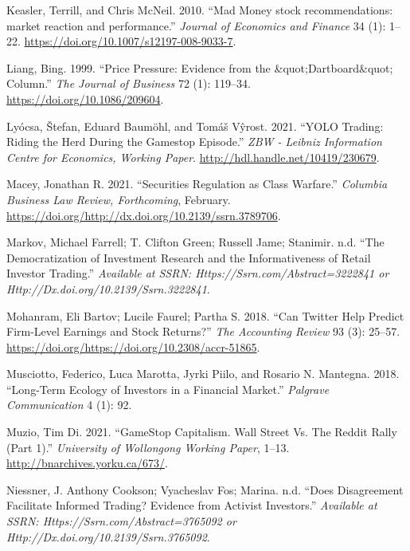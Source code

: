 \documentclass[12pt,]{article}
\begin{document}
\leavevmode\hypertarget{ref-keasler2010}{}%
Keasler, Terrill, and Chris McNeil. 2010. ``Mad Money stock
recommendations: market reaction and performance.'' \emph{Journal of
Economics and Finance} 34 (1): 1--22.
\url{https://doi.org/10.1007/s12197-008-9033-7}.

\leavevmode\hypertarget{ref-liang1999}{}%
Liang, Bing. 1999. ``Price Pressure: Evidence from the
\&quot;Dartboard\&quot; Column.'' \emph{The Journal of Business} 72 (1):
119--34. \url{https://doi.org/10.1086/209604}.

\leavevmode\hypertarget{ref-lyocsa2021}{}%
Lyócsa, Štefan, Eduard Baumöhl, and Tomáš Vŷrost. 2021. ``YOLO Trading:
Riding the Herd During the Gamestop Episode.'' \emph{ZBW - Leibniz
Information Centre for Economics, Working Paper}.
\url{http://hdl.handle.net/10419/230679}.

\leavevmode\hypertarget{ref-macey2021}{}%
Macey, Jonathan R. 2021. ``Securities Regulation as Class Warfare.''
\emph{Columbia Business Law Review, Forthcoming}, February.
\url{https://doi.org/http://dx.doi.org/10.2139/ssrn.3789706}.

\leavevmode\hypertarget{ref-farrell2018}{}%
Markov, Michael Farrell; T. Clifton Green; Russell Jame; Stanimir. n.d.
``The Democratization of Investment Research and the Informativeness of
Retail Investor Trading.'' \emph{Available at SSRN:
Https://Ssrn.com/Abstract=3222841 or
Http://Dx.doi.org/10.2139/Ssrn.3222841}.

\leavevmode\hypertarget{ref-bartov2018}{}%
Mohanram, Eli Bartov; Lucile Faurel; Partha S. 2018. ``Can Twitter Help
Predict Firm-Level Earnings and Stock Returns?'' \emph{The Accounting
Review} 93 (3): 25--57.
\url{https://doi.org/https://doi.org/10.2308/accr-51865}.

\leavevmode\hypertarget{ref-musciotto2018}{}%
Musciotto, Federico, Luca Marotta, Jyrki Piilo, and Rosario N. Mantegna.
2018. ``Long-Term Ecology of Investors in a Financial Market.''
\emph{Palgrave Communication} 4 (1): 92.

\leavevmode\hypertarget{ref-dimuzio2021}{}%
Muzio, Tim Di. 2021. ``GameStop Capitalism. Wall Street Vs. The Reddit
Rally (Part 1).'' \emph{University of Wollongong Working Paper}, 1--13.
\url{http://bnarchives.yorku.ca/673/}.

\leavevmode\hypertarget{ref-cookson2021}{}%
Niessner, J. Anthony Cookson; Vyacheslav Fos; Marina. n.d. ``Does
Disagreement Facilitate Informed Trading? Evidence from Activist
Investors.'' \emph{Available at SSRN: Https://Ssrn.com/Abstract=3765092
or Http://Dx.doi.org/10.2139/Ssrn.3765092}.
\end{document}
